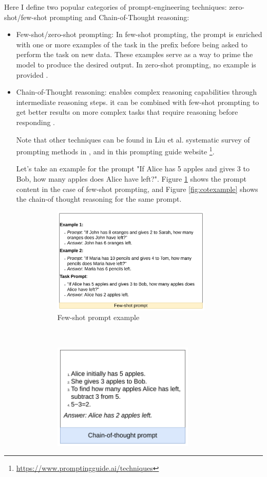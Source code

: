 Here I define two popular categories of prompt-engineering techniques: zero-shot/few-shot prompting and Chain-of-Thought reasoning:
\begin{itemize}
	\item Few-shot/zero-shot prompting: In few-shot prompting, the prompt is enriched with one or more examples of the task in the prefix before being asked to perform the task on new data. These examples serve as a way to prime the model to produce the desired output. In zero-shot prompting, no example is provided \cite{brown2020languagemodelsfewshotlearners,10.1145/3560815}.
	
	
	\item Chain-of-Thought reasoning: enables complex reasoning capabilities through intermediate reasoning steps. it can be combined with few-shot prompting to get better results on more complex tasks that require reasoning before responding \cite{10.5555/3600270.3602070}.
	
	Note that other techniques can be found in Liu et al. systematic survey of prompting methods in \cite{10.1145/3560815}, and in this prompting guide website \footnote{\url{https://www.promptingguide.ai/techniques}}.
	
	Let's take an example for the prompt "If Alice has 5 apples and gives 3 to Bob, how many apples does Alice have left?". Figure \ref{fig:fewshotexample} shows the prompt content in the case of few-shot prompting, and Figure \ref{fig:cotexample} shows the chain-of thought reasoning for the same prompt.
	
	
	\begin{figure}[t!]
		\centering
		\begin{subfigure}[t]{0.5\linewidth}
			\includegraphics[height=2in]{./pics/soaPics/fewshotpromtexample.png}
			\caption{Few-shot prompt example}
			\label{fig:fewshotexample}
		\end{subfigure}%
		~ 
		\begin{subfigure}[t]{0.5\linewidth}
			\includegraphics[height=2in]{ ./pics/soaPics/cotpromptexample.png }
		

\end{subfigure}
\end{figure}
\end{itemize}
